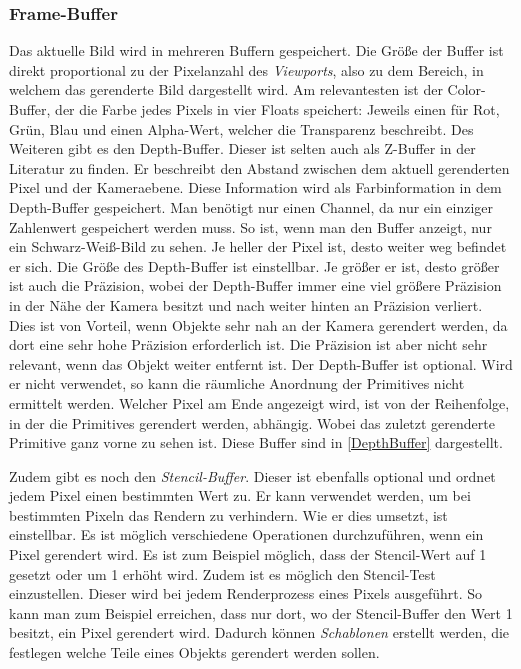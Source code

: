\subsubsection{Frame-Buffer}
Das aktuelle Bild wird in mehreren Buffern gespeichert. Die Größe der Buffer ist direkt proportional zu der Pixelanzahl des \textit{Viewports}, also zu dem Bereich, in welchem das gerenderte Bild dargestellt wird. 
Am relevantesten ist der Color-Buffer, der die Farbe jedes Pixels in vier Floats speichert: Jeweils einen für Rot, Grün, Blau und einen Alpha-Wert, welcher die Transparenz beschreibt. Des Weiteren gibt es den Depth-Buffer. Dieser ist selten auch als Z-Buffer in der Literatur zu finden. Er beschreibt den Abstand zwischen dem aktuell gerenderten Pixel und der Kameraebene. Diese Information wird als Farbinformation in dem Depth-Buffer gespeichert. 
Man benötigt nur einen Channel, da nur ein einziger Zahlenwert gespeichert werden muss. So ist, wenn man den Buffer anzeigt, nur ein Schwarz-Weiß-Bild zu sehen. 
Je heller der Pixel ist, desto weiter weg befindet er sich. Die Größe des Depth-Buffer ist einstellbar. Je größer er ist, desto größer ist auch die Präzision, wobei der Depth-Buffer immer eine viel größere Präzision in der Nähe der Kamera besitzt und nach weiter hinten an Präzision verliert. Dies ist von Vorteil, wenn Objekte sehr nah an der Kamera gerendert werden, da dort eine sehr hohe Präzision erforderlich ist. 
Die Präzision ist aber nicht sehr relevant, wenn das Objekt weiter entfernt ist. Der Depth-Buffer ist optional. Wird er nicht verwendet, so kann die räumliche Anordnung der Primitives nicht ermittelt werden. Welcher Pixel am Ende angezeigt wird, ist von der Reihenfolge, in der die Primitives gerendert werden, abhängig. Wobei das zuletzt gerenderte Primitive ganz vorne zu sehen ist. Diese Buffer sind in \cref{DepthBuffer} dargestellt. 

Zudem gibt es noch den \textit{Stencil-Buffer}. Dieser ist ebenfalls optional und ordnet jedem Pixel einen bestimmten Wert zu. Er kann verwendet werden, um bei bestimmten Pixeln das Rendern zu verhindern. Wie er dies umsetzt, ist einstellbar. Es ist möglich verschiedene Operationen durchzuführen, wenn ein Pixel gerendert wird. Es ist zum Beispiel möglich, dass der Stencil-Wert auf 1 gesetzt oder um 1 erhöht wird. 
Zudem ist es möglich den Stencil-Test einzustellen. Dieser wird bei jedem Renderprozess eines Pixels ausgeführt. So kann man zum Beispiel erreichen, dass nur dort, wo der Stencil-Buffer den Wert 1 besitzt, ein Pixel gerendert wird. Dadurch können \textit{Schablonen} erstellt werden, die festlegen welche Teile eines Objekts gerendert werden sollen.

